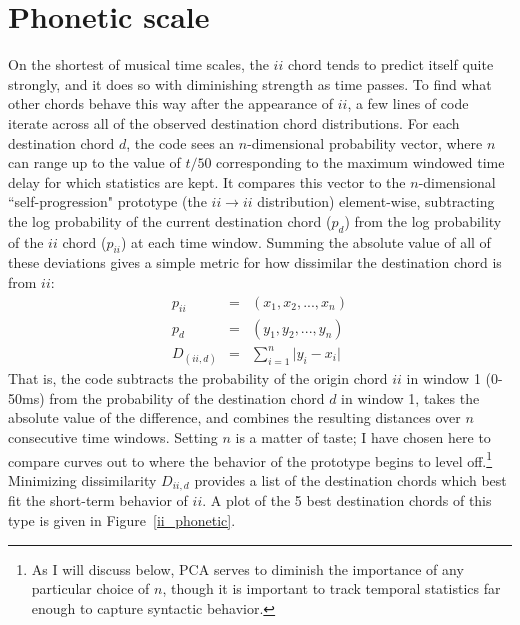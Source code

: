 \section{Phonetic scale}
On the shortest of musical time scales, the $ii$ chord tends to predict itself quite strongly, and it does so with diminishing strength as time passes.  To find what other chords behave this way after the appearance of $ii$, a few lines of code iterate across all of the observed destination chord distributions.  For each destination chord $d$, the code sees an $n$-dimensional probability vector, where $n$ can range up to the value of $t/50$ corresponding to the maximum windowed time delay for which statistics are kept.  It compares this vector to the $n$-dimensional ``self-progression" prototype (the $ii \rightarrow ii$ distribution) element-wise, subtracting the log probability of the current destination chord ($p_d$) from the log probability of the $ii$ chord ($p_{ii}$) at each time window.  Summing the absolute value of all of these deviations gives a simple metric for how dissimilar the destination chord is from $ii$:
\begin{eqnarray}
p_{ii} &=& (x_1, x_2, ... ,  x_n) \\
p_{d} &=& (y_1, y_2, ..., y_n) \\
D_{(ii,d)} &=& \sum_{i=1}^{n} \lvert y_i - x_i \rvert
\end{eqnarray}
That is, the code subtracts the probability of the origin chord $ii$ in window 1 (0-50ms) from the probability of the destination chord $d$ in window 1, takes the absolute value of the difference, and combines the resulting distances over $n$ consecutive time windows.  Setting $n$ is a matter of taste; I have chosen here to compare curves out to where the behavior of the prototype begins to level off.\footnote{As I will discuss below, PCA serves to diminish the importance of any particular choice of $n$, though it is important to track temporal statistics far enough to capture syntactic behavior.}  Minimizing dissimilarity $D_{ii,d}$ provides a list of the destination chords which best fit the short-term behavior of $ii$.  A plot of the 5 best destination chords of this type is given in Figure~\ref{ii_phonetic}.

